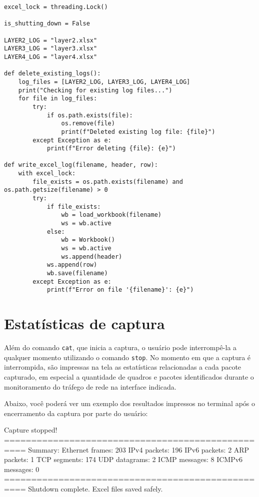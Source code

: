 \documentclass[12pt]{article}
\begin{document}
\begin{lstlisting}[style=vscode]
excel_lock = threading.Lock()

is_shutting_down = False

LAYER2_LOG = "layer2.xlsx"
LAYER3_LOG = "layer3.xlsx"
LAYER4_LOG = "layer4.xlsx"

def delete_existing_logs():
    log_files = [LAYER2_LOG, LAYER3_LOG, LAYER4_LOG]
    print("Checking for existing log files...")
    for file in log_files:
        try:
            if os.path.exists(file):
                os.remove(file)
                print(f"Deleted existing log file: {file}")
        except Exception as e:
            print(f"Error deleting {file}: {e}")

def write_excel_log(filename, header, row):
    with excel_lock:
        file_exists = os.path.exists(filename) and os.path.getsize(filename) > 0
        try:
            if file_exists:
                wb = load_workbook(filename)
                ws = wb.active
            else:
                wb = Workbook()
                ws = wb.active
                ws.append(header)
            ws.append(row)
            wb.save(filename)
        except Exception as e:
            print(f"Error on file '{filename}': {e}")
\end{lstlisting}

\section{Estatísticas de captura}
Além do comando \texttt{cat}, que inicia a captura, o usuário pode interrompê-la a qualquer momento utilizando o comando \texttt{stop}. No momento em que a captura é interrompida, são impressas na tela as estatísticas relacionadas a cada pacote capturado, em especial a quantidade de quadros e pacotes identificados durante o monitoramento do tráfego de rede na interface indicada.

\quad Abaixo, você poderá ver um exemplo dos resultados impressos no terminal após o encerramento da captura por parte do usuário:

\begin{terminal}
Capture stopped!
==================================================
Summary:
Ethernet frames: 203
IPv4 packets:    196
IPv6 packets:    2
ARP packets:     1
TCP segments:    174
UDP datagrams:   2
ICMP messages:   8
ICMPv6 messages: 0
==================================================
Shutdown complete. Excel files saved safely.
\end{terminal}
\end{document}
